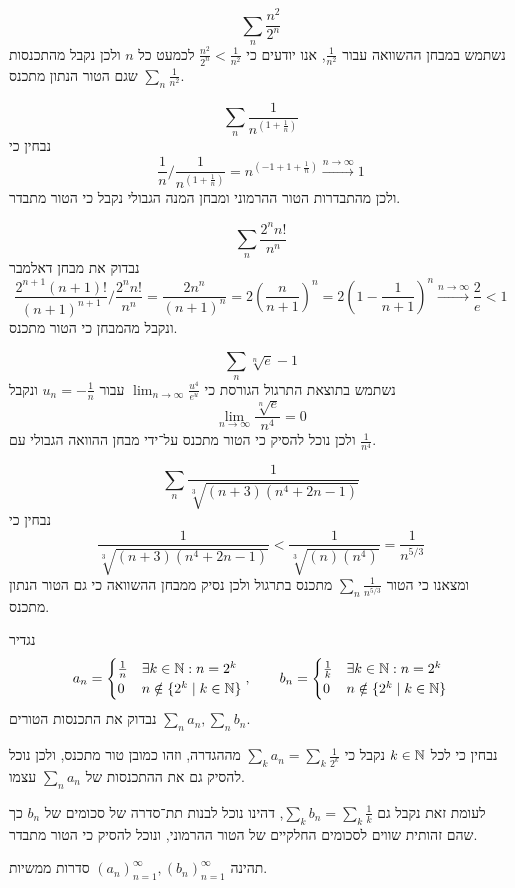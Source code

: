 \Subquestion{}
\[
	\sum_n \frac{n^2}{2^n}
\]
נשתמש במבחן ההשוואה עבור $\frac{1}{n^2}$, אנו יודעים כי $\frac{n^2}{2^n} < \frac{1}{n^2}$ לכמעט כל $n$ ולכן נקבל מהתכנסות $\sum_n \frac{1}{n^2}$ שגם הטור הנתון מתכנס.

\Subquestion{}
\[
	\sum_n \frac{1}{n^{(1 + \frac{1}{n})}}
\]
נבחין כי
\[
	\frac{1}{n} / \frac{1}{n^{(1 + \frac{1}{n})}}
	= n^{(-1 + 1 + \frac{1}{n})}
	\xrightarrow{n \to \infty} 1
\]
ולכן מהתבדרות הטור ההרמוני ומבחן המנה הגבולי נקבל כי הטור מתבדר.

\Subquestion{}
\[
	\sum_n \frac{2^n n!}{n^n}
\]
נבדוק את מבחן דאלמבר
\[
	\frac{2^{n + 1} (n + 1)!}{{(n + 1)}^{n + 1}} / \frac{2^n n!}{n^n}
	= \frac{2 n^n}{{(n + 1)}^n}
	= 2 {(\frac{n}{n + 1})}^n
	= 2 {(1 - \frac{1}{n + 1})}^n
	\xrightarrow{n \to \infty} \frac{2}{e} < 1
\]
ונקבל מהמבחן כי הטור מתכנס.

\Subquestion{}
\[
	\sum_n \sqrt[n]{e} - 1
\]
נשתמש בתוצאת התרגול הגורסת כי $\lim_{n \to \infty} \frac{u^4}{e^u}$ עבור $u_n = -\frac{1}{n}$ ונקבל
\[
	\lim_{n \to \infty} \frac{\sqrt[n]{e}}{n^4} = 0
\]
ולכן נוכל להסיק כי הטור מתכנס על־ידי מבחן ההוואה הגבולי עם $\frac{1}{n^4}$.

\Subquestion{}
\[
	\sum_n \frac{1}{\sqrt[3]{(n + 3)(n^4 + 2n - 1)}}
\]
נבחין כי
\[
	\frac{1}{\sqrt[3]{(n + 3)(n^4 + 2n - 1)}} < \frac{1}{\sqrt[3]{(n)(n^4)}} = \frac{1}{n^{5/3}}
\]
ומצאנו כי הטור $\sum_n \frac{1}{n^{5/3}}$ מתכנס בתרגול ולכן נסיק ממבחן ההשוואה כי גם הטור הנתון מתכנס.

\Question{}
נגדיר
\[
	a_n = \begin{cases}
		\frac{1}{n} & \exists k \in \mathbb{N} : n = 2^k \\
		0 & n \notin \{ 2^k \mid k \in \mathbb{N} \}
	\end{cases},
	\qquad
	b_n = \begin{cases}
		\frac{1}{k} & \exists k \in \mathbb{N} : n = 2^k \\
		0 & n \notin \{ 2^k \mid k \in \mathbb{N} \}
	\end{cases}
\]
נבדוק את התכנסות הטורים $\sum_n a_n, \sum_n b_n$.

נבחין כי לכל $k \in \mathbb{N}$ נקבל כי $\sum_k a_n = \sum_k \frac{1}{2^k}$ מההגדרה, וזהו כמובן טור מתכנס, ולכן נוכל להסיק גם את ההתכנסות של $\sum_n a_n$ עצמו.

לעומת זאת נקבל גם $\sum_k b_n = \sum_k \frac{1}{k}$, דהינו נוכל לבנות תת־סדרה של סכומים של $b_n$ כך שהם זהותית שווים לסכומים החלקיים של הטור ההרמוני, ונוכל להסיק כי הטור מתבדר.

\Question{}
תהינה ${(a_n)}_{n = 1}^\infty, {(b_n)}_{n = 1}^\infty$ סדרות ממשיות.

